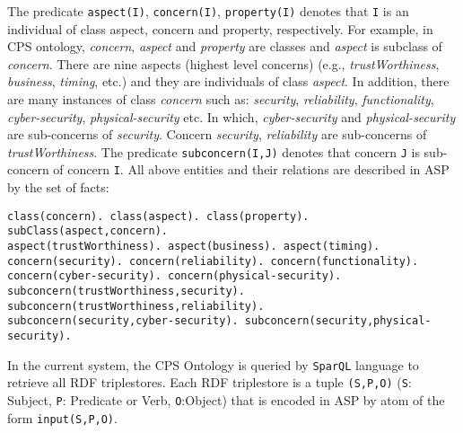 The predicate {\tt \small aspect(I)}, {\tt \small concern(I)}, {\tt \small property(I)} denotes that {\tt \small I} is an individual of class aspect, concern and property, respectively. For example, in CPS ontology, \emph{concern}, \emph{aspect} and \emph{property} are classes and \emph{aspect} is subclass of \emph{concern}. There are nine aspects (highest level concerns) (e.g., \emph{trustWorthiness}, \emph{business}, \emph{timing}, etc.) and they are individuals of class \emph{aspect}. In addition, there are many instances of class \emph{concern} such as: \emph{security}, \emph{reliability}, \emph{functionality}, \emph{cyber-security}, \emph{physical-security} etc. In which, \emph{cyber-security} and \emph{physical-security} are sub-concerns of \emph{security}. Concern \emph{security}, \emph{reliability} are sub-concerns of \emph{trustWorthiness}. The predicate {\tt \small subconcern(I,J)} denotes that concern {\tt \small J} is sub-concern of concern {\tt \small I}. All above entities and their relations are described in ASP by the set of facts:
\begin{lstlisting}[language=clingo,caption=ASP representation aspects and concerns in Ontology $\Omega$, label=list4, mathescape=true,xleftmargin=.01\textwidth, breaklines=true]
class(concern). class(aspect). class(property).
subClass(aspect,concern).
aspect(trustWorthiness). aspect(business). aspect(timing). 
concern(security). concern(reliability). concern(functionality). 
concern(cyber-security). concern(physical-security).
subconcern(trustWorthiness,security). subconcern(trustWorthiness,reliability).
subconcern(security,cyber-security). subconcern(security,physical-security).
\end{lstlisting}
In the current system, the CPS Ontology is queried by {\tt SparQL} language to retrieve all RDF triplestores. Each RDF triplestore is a tuple {\tt (S,P,O)} ({\tt S}: Subject, {\tt P}: Predicate or Verb, {\tt O}:Object) that is encoded in ASP by atom of the form {\tt input(S,P,O)}.

